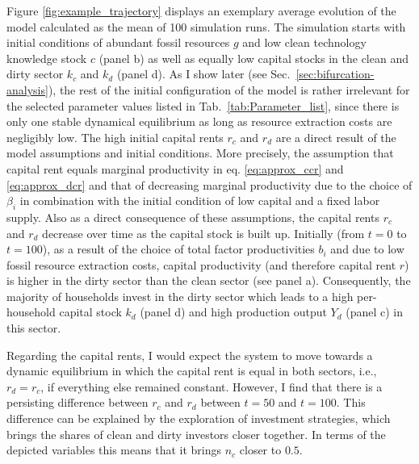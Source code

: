 Figure \ref{fig:example_trajectory} displays an exemplary average evolution of the model calculated as the mean of 100 simulation runs.
The simulation starts with initial conditions of abundant fossil resources $g$ and low clean technology knowledge stock $c$ (panel b) as well as equally low capital stocks in the clean and dirty sector $k_c$ and $k_d$ (panel d). As I show later (see Sec.~\ref{sec:bifurcation-analysis}), the rest of the initial configuration of the model is rather irrelevant for the selected parameter values listed in Tab.~\ref{tab:Parameter_list}, since there is only one stable dynamical equilibrium as long as resource extraction costs are negligibly low.
The high initial capital rents $r_c$ and $r_d$ are a direct result of the model assumptions and initial conditions. More precisely, the assumption that capital rent equals marginal productivity in eq. \ref{eq:approx_ccr} and \ref{eq:approx_dcr} and that of decreasing marginal productivity due to the choice of $\beta_i$ in combination with the initial condition of low capital and a fixed labor supply. Also as a direct consequence of these assumptions, the capital rents $r_c$ and $r_d$ decrease over time as the capital stock is built up.
Initially (from $t=0$ to $t=100$), as a result of the choice of total factor productivities $b_i$ and due to low fossil resource extraction costs, capital productivity (and therefore capital rent $r$) is higher in the dirty sector than the clean sector (see panel a). 
Consequently, the majority of households invest in the dirty sector which leads to a high per-household capital stock $k_d$ (panel d) and high production output $Y_d$ (panel c) in this sector.

Regarding the capital rents, I would expect the system to move towards a dynamic equilibrium in which the capital rent is equal in both sectors, i.e., $r_d = r_c$, if everything else remained constant. However, I find that there is a persisting difference between $r_c$ and $r_d$ between $t=50$ and $t=100$.
This difference can be explained by the exploration of investment strategies, which brings the shares of clean and dirty investors closer together. In terms of the depicted variables this means that it brings $n_c$ closer to $0.5$. 

